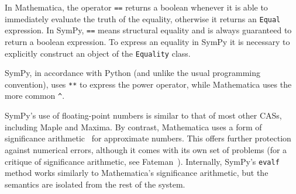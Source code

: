 In Mathematica, the operator \texttt{==} returns a boolean whenever it is able
to immediately evaluate the truth of the equality, otherwise it returns an
\texttt{Equal} expression.  In SymPy, \texttt{==} means structural equality and
is always guaranteed to return a boolean expression.  To express an equality in
SymPy it is necessary to explicitly construct an object of the \texttt{Equality}
class.


SymPy, in accordance with Python (and unlike the usual programming convention),
uses \texttt{**} to express the power operator, while Mathematica uses the more
common \verb|^|.


SymPy's use of floating-point numbers is similar to that of most
other CASs, including Maple and Maxima.
By contrast, Mathematica uses a form
of significance arithmetic~\cite{Sofroniou2005precise} for approximate numbers.
This offers further protection against numerical errors,
although it comes with its own set of problems
(for a critique of significance arithmetic, see Fateman~\cite{Fateman1992}).
Internally, SymPy's \texttt{evalf} method works similarly to Mathematica's
significance arithmetic, but the semantics are isolated from the rest of the system.

